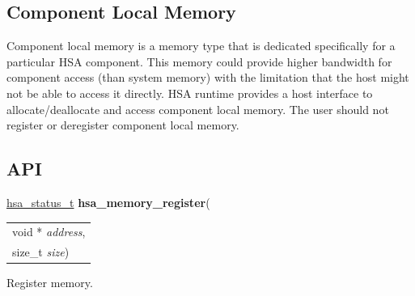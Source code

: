 \documentclass[final]{book}
\newcommand{\hsaarg}[1]{\textit{#1}}
\begin{document}
\hypertarget{device-memory}{}\subsection{Component Local Memory}
\label{device-memory}

Component local memory is a memory type that is dedicated specifically for a
particular HSA component. This memory could provide higher bandwidth for
component access (than system memory) with the limitation that the host might
not be able to access it directly. HSA runtime provides a host interface to
allocate/deallocate and access component local memory. The user should not
register or deregister component local memory.

\subsection{API}
\makeatletter{}

\noindent\begin{tcolorbox}[breakable,nobeforeafter,colframe=white,colback=lightgray,left=0mm]
\hyperlink{group__status_1gad755322e7ff95456520e8abdbe90d225}{hsa_status_t} \hypertarget{group__memory_1gaa4d4efc5ba903ea29587392aa1c8a267}{\textbf{hsa_memory_register}}(
\vspace{-3.5mm}\begin{longtable}{@{}p{\textwidth}}
\hspace{1.7em}void * \hsaarg{address},\\
\hspace{1.7em}size_t \hsaarg{size})\end{longtable}

\end{tcolorbox}
Register memory.
\end{document}

